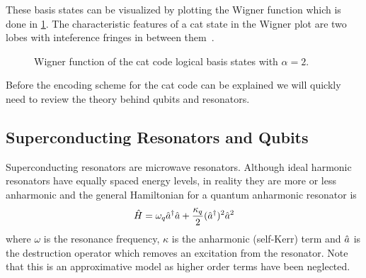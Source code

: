 \documentclass[main.tex]{subfiles}
\begin{document}
These basis states can be visualized by plotting the Wigner function which is done in \cref{fig:cat-code-basis-wigner}. The characteristic features of a cat state in the Wigner plot are two lobes with inteference fringes in between them~\cite{girvin_schrodinger_2017}.

\begin{figure}[H]
	\centering
	\caption{%
	Wigner function of the cat code logical basis states with \(\alpha = 2\).
	}%
	\label{fig:cat-code-basis-wigner}
\end{figure}

Before the encoding scheme for the cat code can be explained we will quickly need to review the theory behind qubits and resonators.

\subsection{Superconducting Resonators and Qubits}
Superconducting resonators are microwave resonators.
Although ideal harmonic resonators have equally spaced energy levels, in reality they are more or less anharmonic and the general Hamiltonian for a quantum anharmonic resonator is
\begin{equation}
    \hat{H} = \omega_{q} \hat{a}^\dagger\hat{a} + \frac{\kappa_q}{2} (\hat{a}^\dagger)^2\hat{a}^2
    \label{eq:resonator-hamiltonian}
\end{equation}
where \( \omega \) is the resonance frequency, \( \kappa \) is the anharmonic (self-Kerr) term and \(\hat{a}\) is the destruction operator which removes an excitation from the resonator.
Note that this is an approximative model as higher order terms have been neglected.
\end{document}
